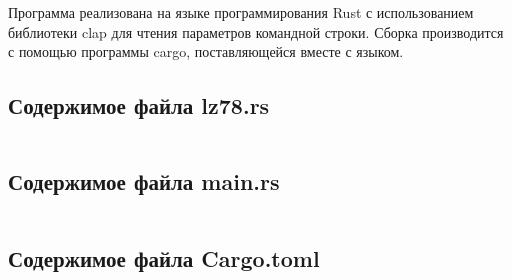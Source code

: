 \documentclass[a4paper,oneside]{article}
\theoremstyle{definition}
\begin{document}
Программа реализована на языке программирования Rust с использованием библиотеки
clap для чтения параметров командной строки. Сборка производится с помощью
программы cargo, поставляющейся вместе с языком.

\subsection{Содержимое файла lz78.rs}
\inputminted{rust}{../../lab8/src/lz78.rs}

\subsection{Содержимое файла main.rs}
\inputminted{rust}{../../lab8/src/main.rs}

\subsection{Содержимое файла Cargo.toml}
\inputminted{toml}{../../lab8/Cargo.toml}
\end{document}
